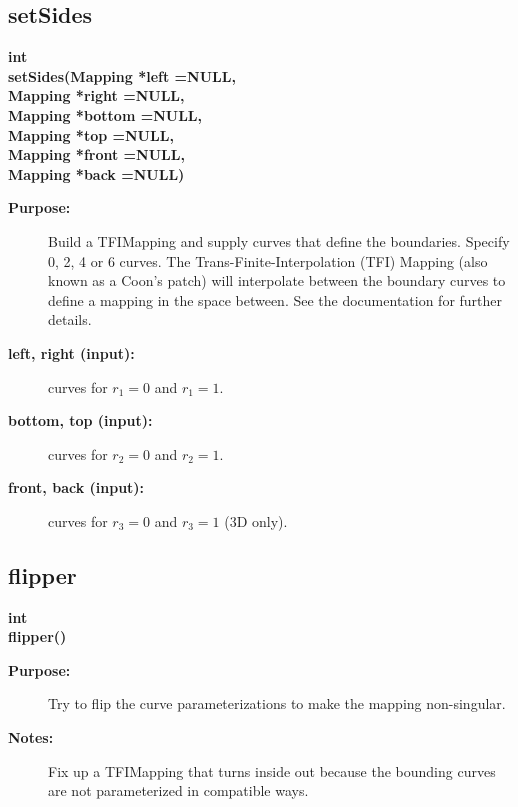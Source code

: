 \subsection{setSides}
 
\newlength{\TFIMappingIncludeArgIndent}
\begin{flushleft} \textbf{%
int  \\ 
\settowidth{\TFIMappingIncludeArgIndent}{setSides(}%
setSides(Mapping *left    =NULL, \\ 
\hspace{\TFIMappingIncludeArgIndent}Mapping *right   =NULL,\\ 
\hspace{\TFIMappingIncludeArgIndent}Mapping *bottom  =NULL,\\ 
\hspace{\TFIMappingIncludeArgIndent}Mapping *top     =NULL,\\ 
\hspace{\TFIMappingIncludeArgIndent}Mapping *front   =NULL,\\ 
\hspace{\TFIMappingIncludeArgIndent}Mapping *back    =NULL)
}\end{flushleft}
\begin{description}
\item[{\bf Purpose:}] 
     Build a TFIMapping and supply curves that define the boundaries.
  Specify 0, 2, 4 or 6 curves.
 The Trans-Finite-Interpolation (TFI) Mapping (also known as a Coon's patch)
 will interpolate between the boundary
 curves to define a mapping in the space between. See the documentation for further
 details.
\item[{\bf left, right (input):}]  curves for $r_1=0$ and $r_1=1$.
\item[{\bf bottom, top (input):}]  curves for $r_2=0$ and $r_2=1$.
\item[{\bf front, back (input):}]  curves for $r_3=0$ and $r_3=1$ (3D only).
 
\end{description}
\subsection{flipper}
 
\begin{flushleft} \textbf{%
int  \\ 
\settowidth{\TFIMappingIncludeArgIndent}{flipper(}%
flipper()
}\end{flushleft}
\begin{description}
\item[{\bf Purpose:}] 
  Try to flip the curve parameterizations to make the mapping non-singular.
\item[{\bf Notes:}] 
   Fix up a TFIMapping that turns inside out because the bounding curves
 are not parameterized in compatible ways.
\end{description}
